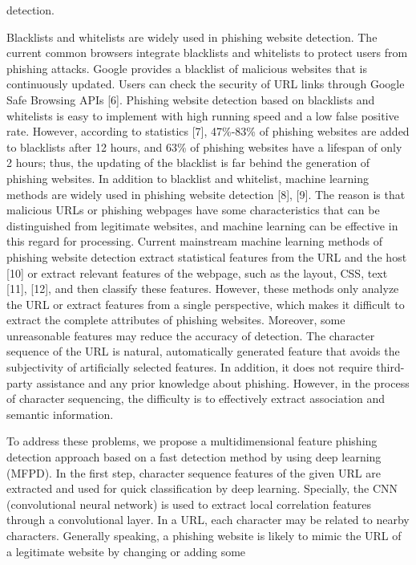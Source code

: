 \documentclass{ieeeaccess}
\begin{document}
detection.\par
Blacklists and whitelists are widely used in phishing
website detection. The current common browsers integrate
blacklists and whitelists to protect users from phishing
attacks. Google provides a blacklist of malicious websites
that is continuously updated. Users can check the security of
URL links through Google Safe Browsing APIs [6]. Phishing
website detection based on blacklists and whitelists is easy
to implement with high running speed and a low false positive
rate. However, according to statistics [7], 47\%-83\% of
phishing websites are added to blacklists after 12 hours, and
63\% of phishing websites have a lifespan of only 2 hours;
thus, the updating of the blacklist is far behind the generation
of phishing websites. In addition to blacklist and
whitelist, machine learning methods are widely used in phishing
website detection [8], [9]. The reason is that malicious
URLs or phishing webpages have some characteristics that
can be distinguished from legitimate websites, and machine
learning can be effective in this regard for processing.
Current mainstream machine learning methods of phishing
website detection extract statistical features from the URL
and the host [10] or extract relevant features of the webpage,
such as the layout, CSS, text [11], [12], and then classify
these features. However, these methods only analyze the
URL or extract features from a single perspective, which
makes it difficult to extract the complete attributes of phishing
websites. Moreover, some unreasonable features may reduce
the accuracy of detection. The character sequence of the
URL is natural, automatically generated feature that avoids
the subjectivity of artificially selected features. In addition,
it does not require third-party assistance and any prior knowledge
about phishing. However, in the process of character
sequencing, the difficulty is to effectively extract association
and semantic information.\par
To address these problems, we propose a multidimensional
feature phishing detection approach based on a fast detection
method by using deep learning (MFPD). In the first step,
character sequence features of the given URL are extracted
and used for quick classification by deep learning. Specially,
the CNN (convolutional neural network) is used to extract
local correlation features through a convolutional layer. In a
URL, each character may be related to nearby characters.
Generally speaking, a phishing website is likely to mimic
the URL of a legitimate website by changing or adding some
\end{document}
